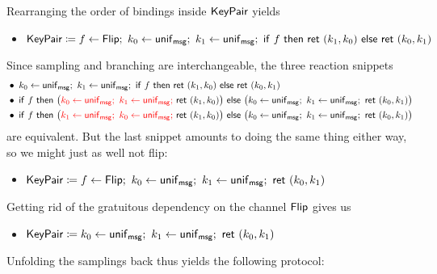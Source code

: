 \noindent Rearranging the order of bindings inside $\mathsf{KeyPair}$ yields
\begin{itemize}
\item $\KeyPair \coloneqq f \leftarrow \Flip; \ k_0 \leftarrow \unif_\msg; \ k_1 \leftarrow \unif_\msg; \ \ifte{f}{\ret{(k_1,k_0)}}{\ret{(k_0,k_1)}}$
\end{itemize}
Since sampling and branching are interchangeable, the three reaction snippets
\begin{align*}
& \bullet \; k_0 \leftarrow \unif_\msg; \ k_1 \leftarrow \unif_\msg; \ \ifte{f}{\ret{(k_1,k_0)}}{\ret{(k_0,k_1)}} \\
& \bullet \; \ifte{f}{\big({\color{red} k_0 \leftarrow \unif_\msg; \ k_1 \leftarrow \unif_\msg; \ } \ret{(k_1,k_0)}\big)}{\big(k_0 \leftarrow \unif_\msg; \ k_1 \leftarrow \unif_\msg; \ \ret{(k_0,k_1)}\big)} \\
& \bullet \; \ifte{f}{\big({\color{red} k_1 \leftarrow \unif_\msg; \ k_0 \leftarrow \unif_\msg; \ } \ret{(k_1,k_0)}\big)}{\big(k_0 \leftarrow \unif_\msg; \ k_1 \leftarrow \unif_\msg; \ \ret{(k_0,k_1)}\big)}
\end{align*}
are equivalent. But the last snippet amounts to doing the same thing either way, so we might just as well not flip:
\begin{itemize}
\item $\KeyPair \coloneqq f \leftarrow \Flip; \ k_0 \leftarrow \unif_\msg; \ k_1 \leftarrow \unif_\msg; \ \ret{(k_0,k_1)}$
\end{itemize}
Getting rid of the gratuitous dependency on the channel $\mathsf{Flip}$ gives us
\begin{itemize}
\item $\KeyPair \coloneqq k_0 \leftarrow \unif_\msg; \ k_1 \leftarrow \unif_\msg; \ \ret{(k_0,k_1)}$
\end{itemize}
Unfolding the samplings back thus yields the following protocol:

